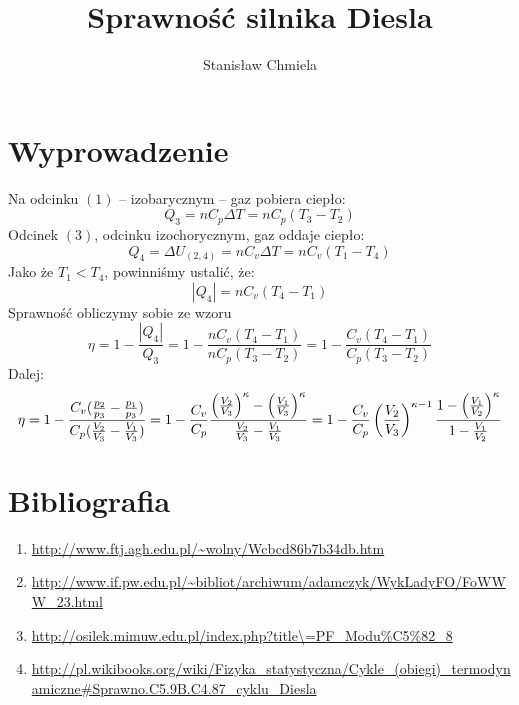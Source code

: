 \documentclass [a4paper, 12pt]{article}
\author{Stanisław Chmiela}
\title{Sprawność silnika Diesla}
\begin{document}
\maketitle
\section{Wyprowadzenie}
Na odcinku $(1)$ -- izobarycznym -- gaz pobiera ciepło:
\[
    Q_3 = nC_p \Delta T = nC_p (T_3-T_2)
\]
Odcinek $(3)$, odcinku izochorycznym, gaz oddaje ciepło:
\[
    Q_4 = \Delta U_{(2,4)} = nC_v \Delta T = nC_v(T_1-T_4)
\]
Jako że $T_1 < T_4$, powinniśmy ustalić, że:
\[
    |Q_4| = nC_v(T_4-T_1)
\]
Sprawność obliczymy sobie ze wzoru
\[
    \eta = 1-\frac{|Q_4|}{Q_3} = 1-\frac{nC_v(T_4-T_1)}{nC_p(T_3-T_2)} = 1-\frac{C_v(T_4-T_1)}{C_p(T_3-T_2)}
\]
Dalej:
\[
    \eta = 1-\frac{C_v(\frac{p_2}{p_3} - \frac{p_1}{p_3})}{C_p(\frac{V_2}{V_3} - \frac{V_1}{V_3})} =1-{\frac{C_v}{C_p}}{{\left({\frac{V_2}{V_3}}\right)^{\kappa}-\left({\frac{V_1}{V_3}}\right)^{\kappa}}\over{{{V_2}\over{V_3}}-{{V_1}\over{V_3}}}}=1-{\frac{C_v}{C_p}}\left({\frac{V_2}{V_3}}\right)^{\kappa-1}{{1-\left({{V_1}\over{V_2}}\right)^{\kappa}}\over{1-{\frac{V_1}{V_2}}}}
\]
\section{Bibliografia}
\begin{enumerate}
    \item \url{http://www.ftj.agh.edu.pl/\~wolny/Wcbcd86b7b34db.htm}
    \item \url{http://www.if.pw.edu.pl/\~bibliot/archiwum/adamczyk/WykLadyFO/FoWWW\_23.html}
    \item \url{http://osilek.mimuw.edu.pl/index.php?title\=PF\_Modu\%C5\%82\_8}
    \item \url{http://pl.wikibooks.org/wiki/Fizyka\_statystyczna/Cykle\_(obiegi)\_termodynamiczne\#Sprawno.C5.9B.C4.87\_cyklu\_Diesla}
\end{enumerate}
\end{document}
